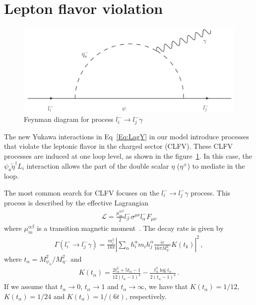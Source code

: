 \documentclass[12pt]{article}
\begin{document}
\section{Lepton flavor violation}
\label{sec:LFV}
%
\begin{figure}
\centering
\includegraphics[scale=0.6]{LFV.pdf}
\caption{Feynman diagram for process $l^{-}_{i} \to l^{-}_{j} \gamma$}
\label{fig:LFV}
\end{figure}
%
The new Yukawa interactions in Eq~\eqref{Eq:LagY} in our model introduce processes that violate the leptonic flavor in the charged sector (CLFV). These CLFV processes are induced at one loop level, as shown in the figure~\ref{fig:LFV}. In this case, the $\psi_{a} \widetilde{\eta}^{\dagger} L_{i}$ interaction allows the part of the double scalar $\eta$ ($\eta^{\pm}$) to mediate in the loop.

The most common search for CLFV focuses on the $l^{-}_{i} \to l^{-}_{j} \gamma$ process. This process is described by the effective Lagrangian
%
\begin{align}
    \mathcal{L} = \frac{\mu_{m}^{\alpha \beta}}{2} l^{-}_{\beta} \sigma^{\mu \nu} l^{-}_{\alpha} F_{\mu \nu}
\end{align}
%
where $\mu_{m}^{\alpha \beta}$ is a transition magnetic moment~\cite{Toma:2013zsa}.
The decay rate is given by~\cite{Lavoura:2003xp}
%
\begin{align}
 \Gamma(l^{-}_{i} \to l^{-}_{j} \gamma) = \frac{m^{3}_{i}}{16 \pi} \left| \sum_{\alpha} h^{\alpha}_{i} m_{i} h^{\alpha}_{j} \frac{i e}{16 \pi M^{2}_{\eta^{-}}} K(t_{k}) \right|^{2}\,, 
\end{align}
%
where $t_{\alpha} = M^{2}_{\psi_{\alpha}}/M^{2}_{\eta^{-}}$ and
%
\begin{align}
    K(t_{\alpha}) = \frac{2t_{\alpha}^{2}+5t_{\alpha}-1}{12(t_{\alpha}-1)^{3}} - \frac{t_{\alpha}^{2}\log t_{\alpha}}{2(t_{\alpha}-1)^{4}}\,.
\end{align}
%
If we assume that $t_{\alpha} \to 0$, $t_{\alpha} \to 1$ and $t_{\alpha} \to \infty$, we have that $K(t_{\alpha}) = 1/12$, $K(t_{\alpha}) = 1/24$ and $K(t_{\alpha}) = 1/(6t)$, respectively.
\end{document}
